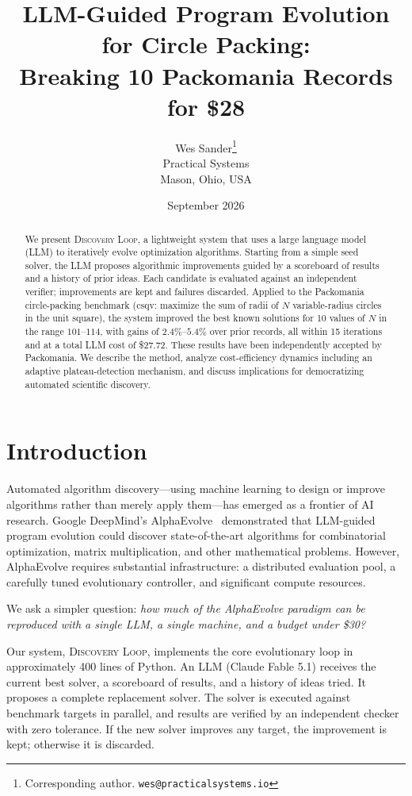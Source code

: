 \documentclass[11pt]{article}
\title{LLM-Guided Program Evolution for Circle Packing:\\
Breaking 10 Packomania Records for \$28}
\author{
  Wes Sander\thanks{Corresponding author. \texttt{wes@practicalsystems.io}} \\
  Practical Systems \\
  Mason, Ohio, USA
}
\date{September 2026}
\begin{document}
\maketitle

\begin{abstract}
We present \textsc{Discovery Loop}, a lightweight system that uses a large language model (LLM)
to iteratively evolve optimization algorithms. Starting from a simple seed solver, the LLM
proposes algorithmic improvements guided by a scoreboard of results and a history of prior ideas.
Each candidate is evaluated against an independent verifier; improvements are kept and failures
discarded. Applied to the Packomania circle-packing benchmark (csqv: maximize the sum of radii
of $N$ variable-radius circles in the unit square), the system improved the best known solutions
for 10 values of $N$ in the range $101$--$114$, with gains of $2.4\%$--$5.4\%$ over prior records,
all within 15 iterations and at a total LLM cost of \$27.72. These results have been independently
accepted by Packomania. We describe the method, analyze cost-efficiency dynamics including an
adaptive plateau-detection mechanism, and discuss implications for democratizing automated
scientific discovery.
\end{abstract}

\section{Introduction}

Automated algorithm discovery---using machine learning to design or improve algorithms rather
than merely apply them---has emerged as a frontier of AI research. Google DeepMind's
AlphaEvolve~\citep{alphaevolve2025} demonstrated that LLM-guided program evolution could
discover state-of-the-art algorithms for combinatorial optimization, matrix multiplication,
and other mathematical problems. However, AlphaEvolve requires substantial infrastructure:
a distributed evaluation pool, a carefully tuned evolutionary controller, and significant
compute resources.

We ask a simpler question: \emph{how much of the AlphaEvolve paradigm can be reproduced
with a single LLM, a single machine, and a budget under \$30?}

Our system, \textsc{Discovery Loop}, implements the core evolutionary loop in approximately
400 lines of Python. An LLM (Claude Fable 5.1) receives the current best solver, a scoreboard
of results, and a history of ideas tried. It proposes a complete replacement solver. The solver
is executed against benchmark targets in parallel, and results are verified by an independent
checker with zero tolerance. If the new solver improves any target, the improvement is kept;
otherwise it is discarded.
\end{document}
